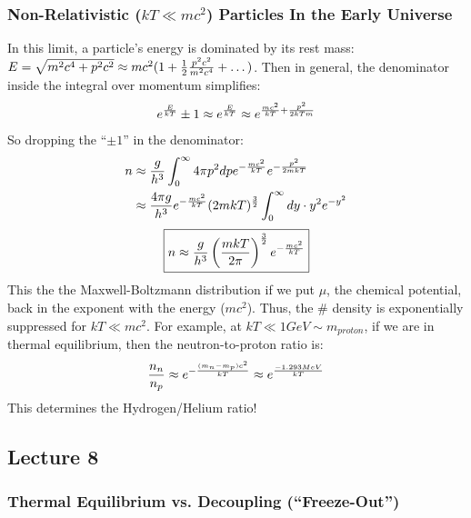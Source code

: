 \documentclass{article}
\def\hf{\frac12}
\def\hf{\frac12}
\begin{document}
\subsubsection*{ Non-Relativistic ($kT\ll mc^2$) Particles In the Early Universe }

In this limit, a particle's energy is dominated by its rest mass:
$E=\sqrt{m^2c^4+p^2c^2}\approx mc^2(1+\hf{p^2c^2\over m^2c^4}+\dots)$.  
Then in general, the denominator inside the integral over momentum simplifies:
\def\emckt{e^{-{mc^2\over kT}}}
$$e^{E\over kT}\pm 1\approx e^{E\over kT}\approx e^{{mc^2\over kT}+
{p^2\over 2kTm}}$$
So dropping the ``$\pm 1$'' in the denominator:
\begin{align}
n&\approx {g\over h^3}\int_0^\infty{4\pi p^2dpe^{-{mc^2\over kT}}
e^{-{p^2\over 2mkT}}}\\
&\approx{4\pi g\over h^3}\emckt(2mkT)^{3\over 2}\int_0^\infty{dy\cdot y^2
e^{-y^2}}\\
\end{align}
$$\boxed{n\approx{g\over h^3}\left({mkT\over 2\pi}\right)^{3\over 2}\emckt}$$
This the the Maxwell-Boltzmann distribution if we put $\mu$, the chemical
potential, back in the exponent with the energy ($mc^2$).  Thus, the \#
density is exponentially suppressed for $kT\ll mc^2$.  For example, at
$kT\ll 1GeV\sim m_{proton}$, if we are in thermal equilibrium, then the
neutron-to-proton ratio is:
$${n_n\over n_p}\approx e^{-{(m_n-m_p)c^2\over kT}}\approx e^{-1.293MeV\over
kT}$$
This determines the Hydrogen/Helium ratio!


\subsection{Lecture 8}

\subsubsection*{ Thermal Equilibrium vs. Decoupling (``Freeze-Out'')}
\end{document}
